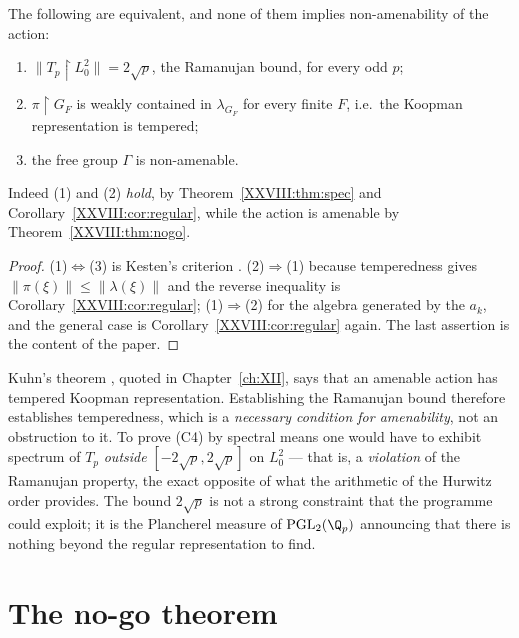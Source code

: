 \begin{theorem}\label{XXVIII:thm:vacuous}
The following are equivalent, and none of them implies non-amenability of the action:
\begin{enumerate}
\item $\|T_p\restriction L^2_0\|=2\sqrt p$, the Ramanujan bound, for every odd $p$;
\item $\pi\restriction G_F$ is weakly contained in $\lambda_{G_F}$ for every finite $F$, i.e.\ the
Koopman representation is tempered;
\item the free group $\Gamma$ is non-amenable.
\end{enumerate}
Indeed (1) and (2) \emph{hold}, by Theorem~\ref{XXVIII:thm:spec} and Corollary~\ref{XXVIII:cor:regular}, while
the action is amenable by Theorem~\ref{XXVIII:thm:nogo}.
\end{theorem}

\begin{proof}
(1)$\Leftrightarrow$(3) is Kesten's criterion \cite{Kesten}. (2)$\Rightarrow$(1) because temperedness gives
$\|\pi(\xi)\|\le\|\lambda(\xi)\|$ and the reverse inequality is Corollary~\ref{XXVIII:cor:regular};
(1)$\Rightarrow$(2) for the algebra generated by the $a_k$, and the general case is
Corollary~\ref{XXVIII:cor:regular} again. The last assertion is the content of the paper.
\end{proof}

\begin{remark}\label{XXVIII:rem:orientation}
Kuhn's theorem \cite{Kuhn}, quoted in Chapter~\ref{ch:XII}, says that an amenable action has tempered
Koopman representation. Establishing the Ramanujan bound therefore establishes temperedness, which is a
\emph{necessary condition for amenability}, not an obstruction to it. To prove (C4) by spectral
means one would have to exhibit spectrum of $T_p$ \emph{outside} $[-2\sqrt p,2\sqrt p]$ on
$L^2_0$ --- that is, a \emph{violation} of the Ramanujan property, the exact opposite of what the
arithmetic of the Hurwitz order provides. The bound $2\sqrt p$ is not a strong constraint that the
programme could exploit; it is the Plancherel measure of $\mathrm{PGL}_2(\Q_p)$ announcing that
there is nothing beyond the regular representation to find.
\end{remark}

\section{The no-go theorem}\label{XXVIII:sec:nogo}

